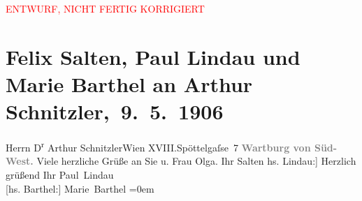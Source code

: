 
\begin{center}
            \textcolor{red}{ENTWURF, NICHT FERTIG KORRIGIERT}
                      \end{center}
            
         
         \renewcommand{\erwaehntePersonen}{Personen: Olga Schnitzler}
         \renewcommand{\erwaehnteOrte}{Orte: Edmund-Weiß-Gasse 7, Wartburg, Wien, XVIII., Währing}
         \renewcommand{\erwaehnteWerke}{}
               \section[Felix Salten, Paul Lindau und Marie Barthel an Arthur Schnitzler, 9. 5. 1906]{ Felix Salten, Paul Lindau und Marie Barthel an Arthur
               Schnitzler, 9. 5. 1906}\nopagebreak{}\rehead{ }\begin{ledgroupsized}[t]{13cm}\normalsize\beginnumbering \toendnotes[C]{\smallbreak\pagebreak[2]} 
\pstart{}{\pb}Herrn D\textsuperscript{r} Arthur Schnitzler\pend{}\pstart{}Wien XVIII.\pend{}\pstart{}Spöttelgaſse 7\pend{}{\bigskip}\pstart
           \noindent{}{\pb}\textcolor{gray}{\textbf{Wartburg von Süd-West.}}\pend
           \pstart
           {\pb}Viele herzliche Grüße an Sie u.
               Frau Olga.\pend
           \pstart Ihr \spacefill\mbox{Salten}\pend{}\pstart
           \noindent{}{[}hs. Lindau:{]} Herzlich grüßend\pend
           \pstart
           Ihr \spacefill\mbox{Paul Lindau}{\\[\baselineskip]}{[}hs. Barthel:{]} \spacefill\mbox{Marie Barthel}\pend
           \leftskip=0em{}
         
         \endnumbering{}\end{ledgroupsized}  \newcommand{\dateiname}{L03423}\newcommand{\titel}{Felix Salten, Paul Lindau und Marie Barthel an Arthur Schnitzler, 9. 5. 1906}\newcommand{\editorInnen}{Martin Anton Müller und Laura Untner}
      